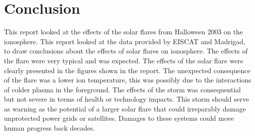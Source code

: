 
\section{Conclusion}

This report looked at the effects of the solar flares from Halloween 2003 on the ionosphere. 
This report looked at the data provided by EISCAT and Madrigad, to draw conclusions about the effects of solar flares on ionosphere.
The effects of the flare were very typical and was expected. The effects of the solar flare were clearly presented in the figures shown in the report. The unexpected consequence of the flare was a lower ion temperature, this was possibly due to the interactions of colder plasma in the foreground.
The effects of the storm was consequential but not severe in terms of health or technology impacts. This storm should serve as warning as the potential of a larger solar flare that could irreparably damage unprotected power grids or satellites. Damages to these systems could move human progress back decades.

